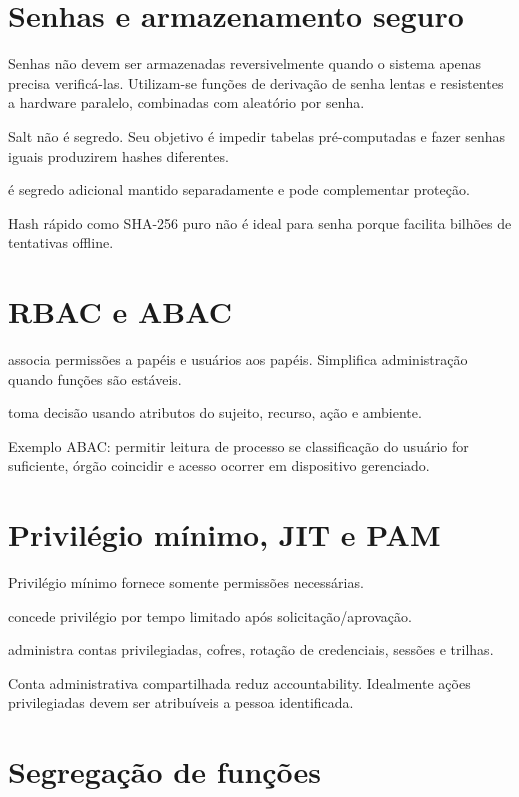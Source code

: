 \section{Senhas e armazenamento seguro}

Senhas não devem ser armazenadas reversivelmente quando o sistema apenas precisa verificá-las. Utilizam-se funções de derivação de senha lentas e resistentes a hardware paralelo, combinadas com  aleatório por senha.

Salt não é segredo. Seu objetivo é impedir tabelas pré-computadas e fazer senhas iguais produzirem hashes diferentes.

 é segredo adicional mantido separadamente e pode complementar proteção.

Hash rápido como SHA-256 puro não é ideal para senha porque facilita bilhões de tentativas offline.

\section{RBAC e ABAC}

 associa permissões a papéis e usuários aos papéis. Simplifica administração quando funções são estáveis.

 toma decisão usando atributos do sujeito, recurso, ação e ambiente.

Exemplo ABAC: permitir leitura de processo se classificação do usuário for suficiente, órgão coincidir e acesso ocorrer em dispositivo gerenciado.

\section{Privilégio mínimo, JIT e PAM}

Privilégio mínimo fornece somente permissões necessárias.

 concede privilégio por tempo limitado após solicitação/aprovação.

 administra contas privilegiadas, cofres, rotação de credenciais, sessões e trilhas.

Conta administrativa compartilhada reduz accountability. Idealmente ações privilegiadas devem ser atribuíveis a pessoa identificada.

\section{Segregação de funções}

